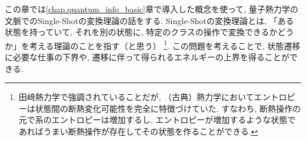この章では\ref{chap.quantum_info_basic}章で導入した概念を使って, 量子熱力学の文脈でのSingle-Shotの変換理論の話をする. 
Single-Shotの変換理論とは, 「ある状態を持っていて, それを別の状態に, 特定のクラスの操作で変換できるかどうか」を考える理論のことを指す（と思う）
\footnote{田﨑熱力学で強調されていることだが, （古典）熱力学においてエントロピーは状態間の断熱変化可能性を完全に特徴づけていた. 
すなわち, 断熱操作の元で系のエントロピーは増加するし, エントロピーが増加するような状態であればうまい断熱操作が存在してその状態を作ることができる. }. 
この問題を考えることで, 状態遷移に必要な仕事の下界や, 遷移に伴って得られるエネルギーの上界を得ることができる. 